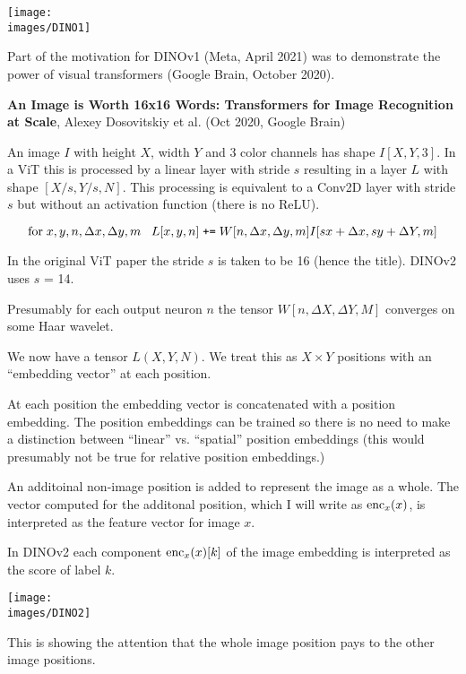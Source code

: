 {{\centerline{\texttt{[image: \\images/DINO1]}}


Part of the motivation for DINOv1 (Meta, April 2021) was to demonstrate the power of visual transformers (Google Brain, October 2020).

\vfill
{\bf An Image is Worth 16x16 Words: Transformers for Image Recognition at Scale}, Alexey Dosovitskiy et al. (Oct 2020, Google Brain)


An image $I$ with height $X$, width $Y$ and $3$ color channels has shape
$I[X,Y,3]$.  In a ViT this is processed by a linear layer with stride $s$ resulting in a layer $L$ with shape $[X/s,Y/s,N]$.
This processing is equivalent to a Conv2D layer with stride $s$ but
without an activation function (there is no ReLU).

$$\mbox{for}\;x,y,n,\Delta x, \Delta y, m\;\;\;L[x,y,n] \;\mbox{\tt +=}\; W[n,\Delta x,\Delta y,m]I[sx+\Delta x,sy+\Delta Y,m]$$

\vfill
In the original ViT paper the stride $s$ is taken to be 16 (hence the title). DINOv2 uses $s$ = 14.

\vfill
Presumably for each output neuron $n$ the tensor $W[n,\Delta X,\Delta Y,M]$ converges on some Haar wavelet.


We now have a tensor $L(X,Y,N)$. We treat this as $X \times Y$ positions with an ``embedding vector'' at each position.

\vfill
At each position the embedding vector is concatenated with a position embedding. The position embeddings can be trained so there is no need
to make a distinction between ``linear'' vs. ``spatial'' position embeddings (this would presumably not be true for relative position embeddings.)

\vfill
An additoinal non-image  position is added to represent the image as a whole. The vector computed for the additonal position, which I will write as $\mathrm{enc}_x(x)$, is interpreted as the feature vector
for image $x$.

\vfill
In DINOv2 each component $\mathrm{enc}_x(x)[k]$ of the image embedding is interpreted as the score of label $k$.


\centerline{\texttt{[image: \\images/DINO2]}}

\vfill
This is showing the attention that the whole image position pays to the other image positions.

}}
